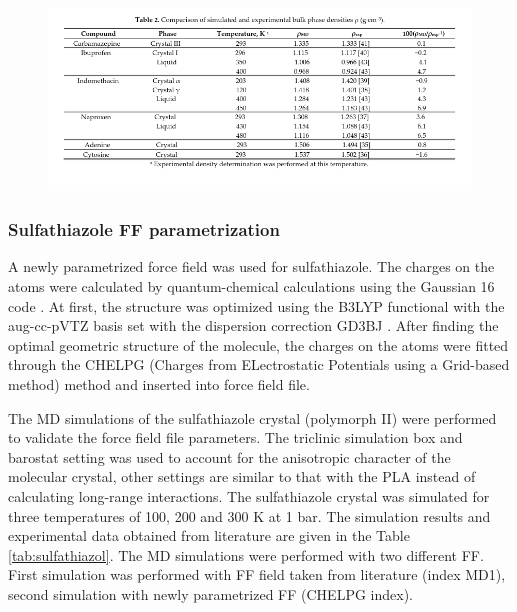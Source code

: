 	\begin{figure}[htb!]
		\centering
		\includegraphics[width=1.0\linewidth]{img/tabulka_validace.png}
	\end{figure}

\subsubsection{Sulfathiazole FF parametrization}
A newly parametrized force field \cite{jorgensen_development_1996} was used for sulfathiazole. The charges on the atoms were calculated by quantum-chemical calculations using the Gaussian 16 code \cite{frisch_gaussian16_2016}. At first, the structure was optimized using the B3LYP functional with the aug-cc-pVTZ basis set with the dispersion correction GD3BJ \cite{smith_revised_2016}. After finding the optimal geometric structure of the molecule, the charges on the atoms were fitted through the CHELPG (Charges from ELectrostatic Potentials using a Grid-based method)\cite{breneman_determining_1990} method and inserted into force field file.
 
The MD simulations of the sulfathiazole crystal (polymorph II) were performed to validate the force field file parameters. The triclinic simulation box and barostat setting was used to account for the anisotropic character of the molecular crystal, other settings are similar to that with the PLA instead of calculating long-range interactions. The sulfathiazole crystal was simulated for three temperatures of 100, 200 and 300 K at 1 bar. The simulation results and experimental data obtained from literature \cite{drebushchak_crystal_2008} are given in the Table \ref{tab:sulfathiazol}. The MD simulations were performed with two different FF. First simulation was performed with FF field taken from literature (index MD1), second simulation with newly parametrized FF (CHELPG index). 
 
